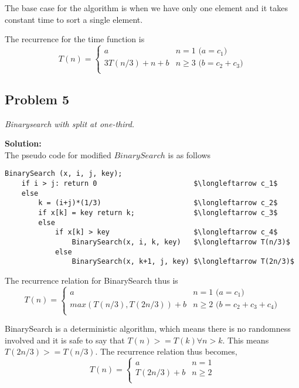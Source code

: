 \documentclass[12pt,a4paper]{article}
\newcommand{\solution}{\noindent\textbf{Solution:}\\}
\begin{document}
The base case for the algorithm is when we have only one element and it takes constant time to sort a single element.

The recurrence for the time function is
\begin{equation}
    T(n) = 
    \begin{cases}
    a & n = 1 \text{ ($a = c_1$)}\\
    3T(n/3) + n + b & n \geq 3 \text{ ($b = c_2 + c_3$)}\\
    \end{cases}
\end{equation}

\newpage
\subsection*{Problem 5}
\textit{
    Binarysearch with split at one-third.
}

\solution
The pseudo code for modified $BinarySearch$ is as follows
\begin{lstlisting}[title=Modified binary search, mathescape=true]
BinarySearch (x, i, j, key);
    if i > j: return 0                       $\longleftarrow c_1$
    else
        k = (i+j)*(1/3)                      $\longleftarrow c_2$
        if x[k] = key return k;              $\longleftarrow c_3$
        else
            if x[k] > key                    $\longleftarrow c_4$
                BinarySearch(x, i, k, key)   $\longleftarrow T(n/3)$
            else
                BinarySearch(x, k+1, j, key) $\longleftarrow T(2n/3)$
\end{lstlisting}

The recurrence relation for BinarySearch thus is
\begin{equation}
    T(n) = 
    \begin{cases}
    a & n = 1 \text{ ($a = c_1$)}\\
    max(T(n/3), T(2n/3)) + b & n \geq 2 \text{ ($b = c_2 + c_3 + c_4$)}\\
    \end{cases}
\end{equation}

BinarySearch is a deterministic algorithm, which means there is no randomness involved and it is safe to say that $T(n) >= T(k) \forall n > k$. This means $T(2n/3) >= T(n/3)$. The recurrence relation thus becomes,
\begin{equation}
    T(n) = 
    \begin{cases}
    a & n = 1\\
    T(2n/3) + b & n \geq 2\\
    \end{cases}
\end{equation}
\end{document}
